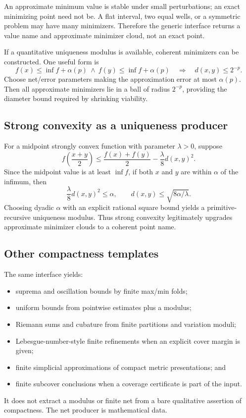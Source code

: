 An approximate minimum value is stable under small perturbations; an exact minimizing
point need not be.  A flat interval, two equal wells, or a symmetric problem may have
many minimizers.  Therefore the generic interface returns a value name and approximate
minimizer cloud, not an exact point.

If a quantitative uniqueness modulus is available, coherent minimizers can be
constructed.  One useful form is
\[
   f(x)\le \inf f+\alpha(p)
   \ \wedge\ 
   f(y)\le \inf f+\alpha(p)
   \quad\Longrightarrow\quad d(x,y)\le2^{-p}.
\]
Choose net/error parameters making the approximation error at most \(\alpha(p)\).
Then all approximate minimizers lie in a ball of radius \(2^{-p}\), providing the
diameter bound required by shrinking viability.

\subsection{Strong convexity as a uniqueness producer}

For a midpoint strongly convex function with parameter \(\lambda>0\), suppose
\[
  f\!\left(\frac{x+y}{2}\right)
  \le\frac{f(x)+f(y)}2-\frac{\lambda}{8}d(x,y)^2.
\]
Since the midpoint value is at least \(\inf f\), if both \(x\) and \(y\) are within
\(\alpha\) of the infimum, then
\[
  \frac{\lambda}{8}d(x,y)^2\le\alpha,
  \qquad d(x,y)\le\sqrt{8\alpha/\lambda}.
\]
Choosing dyadic \(\alpha\) with an explicit rational square bound yields a
primitive-recursive uniqueness modulus.  Thus strong convexity legitimately upgrades
approximate minimizer clouds to a coherent point name.

\subsection{Other compactness templates}

The same interface yields:

\begin{itemize}
\item suprema and oscillation bounds by finite max/min folds;
\item uniform bounds from pointwise estimates plus a modulus;
\item Riemann sums and cubature from finite partitions and variation moduli;
\item Lebesgue-number-style finite refinements when an explicit cover margin is given;
\item finite simplicial approximations of compact metric presentations; and
\item finite subcover conclusions when a coverage certificate is part of the input.
\end{itemize}

It does not extract a modulus or finite net from a bare qualitative assertion of
compactness.  The net producer is mathematical data.
